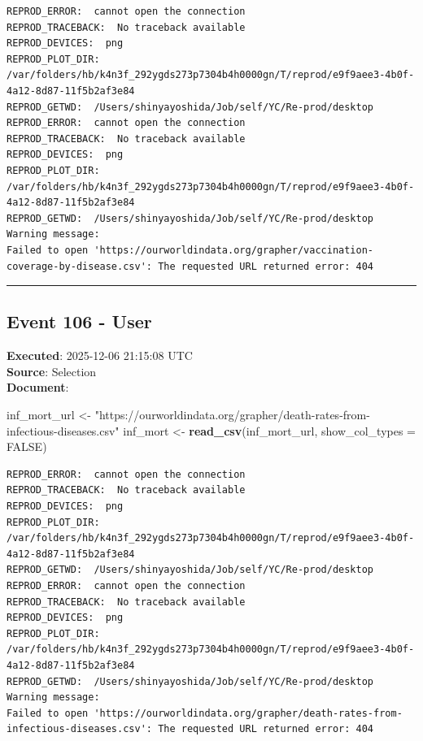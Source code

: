 \documentclass[
  11pt,
]{article}
\newenvironment{Shaded}{\begin{snugshade}}{\end{snugshade}}
\newcommand{\AttributeTok}[1]{\textcolor[rgb]{0.13,0.29,0.53}{#1}}
\newcommand{\ConstantTok}[1]{\textcolor[rgb]{0.56,0.35,0.01}{#1}}
\newcommand{\FunctionTok}[1]{\textcolor[rgb]{0.13,0.29,0.53}{\textbf{#1}}}
\newcommand{\NormalTok}[1]{#1}
\newcommand{\OtherTok}[1]{\textcolor[rgb]{0.56,0.35,0.01}{#1}}
\newcommand{\StringTok}[1]{\textcolor[rgb]{0.31,0.60,0.02}{#1}}
\newenvironment{rpoutput}{\vspace{0.5em}\begin{snugshade}}{\end{snugshade}}
\begin{document}
\begin{rpoutput}

\begin{verbatim}
REPROD_ERROR:  cannot open the connection 
REPROD_TRACEBACK:  No traceback available  
REPROD_DEVICES:  png 
REPROD_PLOT_DIR:  /var/folders/hb/k4n3f_292ygds273p7304b4h0000gn/T/reprod/e9f9aee3-4b0f-4a12-8d87-11f5b2af3e84 
REPROD_GETWD:  /Users/shinyayoshida/Job/self/YC/Re-prod/desktop 
REPROD_ERROR:  cannot open the connection 
REPROD_TRACEBACK:  No traceback available  
REPROD_DEVICES:  png 
REPROD_PLOT_DIR:  /var/folders/hb/k4n3f_292ygds273p7304b4h0000gn/T/reprod/e9f9aee3-4b0f-4a12-8d87-11f5b2af3e84 
REPROD_GETWD:  /Users/shinyayoshida/Job/self/YC/Re-prod/desktop 
Warning message:
Failed to open 'https://ourworldindata.org/grapher/vaccination-coverage-by-disease.csv': The requested URL returned error: 404 
\end{verbatim}

\end{rpoutput}

\begin{center}\rule{0.5\linewidth}{0.5pt}\end{center}

\subsection{Event 106 - User}\label{event-106---user}

\textbf{Executed}: 2025-12-06 21:15:08 UTC\\
\textbf{Source}: Selection\\
\textbf{Document}:

\begin{Shaded}
\begin{Highlighting}[]
\NormalTok{inf\_mort\_url }\OtherTok{\textless{}{-}} \StringTok{"https://ourworldindata.org/grapher/death{-}rates{-}from{-}infectious{-}diseases.csv"}
\NormalTok{inf\_mort }\OtherTok{\textless{}{-}} \FunctionTok{read\_csv}\NormalTok{(inf\_mort\_url, }\AttributeTok{show\_col\_types =} \ConstantTok{FALSE}\NormalTok{)}
\end{Highlighting}
\end{Shaded}

\begin{rpoutput}

\begin{verbatim}
REPROD_ERROR:  cannot open the connection 
REPROD_TRACEBACK:  No traceback available  
REPROD_DEVICES:  png 
REPROD_PLOT_DIR:  /var/folders/hb/k4n3f_292ygds273p7304b4h0000gn/T/reprod/e9f9aee3-4b0f-4a12-8d87-11f5b2af3e84 
REPROD_GETWD:  /Users/shinyayoshida/Job/self/YC/Re-prod/desktop 
REPROD_ERROR:  cannot open the connection 
REPROD_TRACEBACK:  No traceback available  
REPROD_DEVICES:  png 
REPROD_PLOT_DIR:  /var/folders/hb/k4n3f_292ygds273p7304b4h0000gn/T/reprod/e9f9aee3-4b0f-4a12-8d87-11f5b2af3e84 
REPROD_GETWD:  /Users/shinyayoshida/Job/self/YC/Re-prod/desktop 
Warning message:
Failed to open 'https://ourworldindata.org/grapher/death-rates-from-infectious-diseases.csv': The requested URL returned error: 404 
\end{verbatim}

\end{rpoutput}
\end{document}
